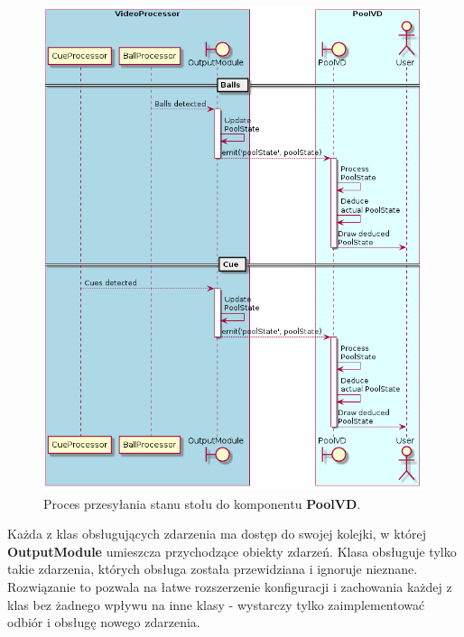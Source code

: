 \documentclass[12pt]{article}
\begin{document}
\begin{figure}[!ht]
    \centering
    \includegraphics[width=15cm]{./diagrams/out/pool_state_sd.png}
    \caption{Proces przesyłania stanu stołu do komponentu \textbf{PoolVD}.}
    \label{pool_state_sd}
\end{figure}


Każda z klas obsługujących zdarzenia ma dostęp do swojej kolejki, w której \textbf{OutputModule} umieszcza przychodzące obiekty zdarzeń. Klasa obsługuje tylko takie zdarzenia, których obsługa została przewidziana i ignoruje nieznane. Rozwiązanie to pozwala na łatwe rozszerzenie konfiguracji i zachowania każdej z klas bez żadnego wpływu na inne klasy - wystarczy tylko zaimplementować odbiór i obsługę nowego zdarzenia.
\end{document}
